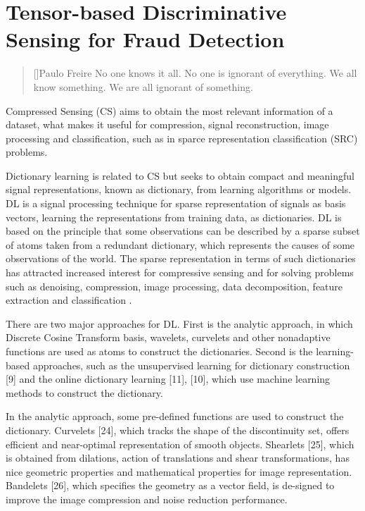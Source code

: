 \chapter{Tensor-based Discriminative Sensing for Fraud Detection}
\label{ch:4_tensor_dl}

\begin{quotation}[]{Paulo Freire}
No one knows it all. No one is ignorant of everything. We all know something. We are all ignorant of something.
\end{quotation}


Compressed Sensing (CS) aims to obtain the most relevant information of a dataset, what makes it useful for compression, signal reconstruction, image processing and classification, such as in sparce representation classification (SRC) problems. 

Dictionary learning is related to CS but seeks to obtain compact and meaningful signal representations, known as dictionary, from learning algorithms or models. DL is a signal processing technique for sparse representation of signals as basis vectors, learning the representations from training data, as dictionaries. DL is based on the principle that some observations can be described by a sparse subset of atoms taken from a redundant dictionary, which represents the causes of some observations of the world. The sparse representation in terms of such dictionaries has attracted increased interest for compressive sensing and for solving problems such as denoising, compression, image processing, data decomposition, feature extraction and classification \cite{tosic2011dictionary, zhang2010discriminative, zhu2016coupled,ravishankar2011mr}. 

There are two major approaches for DL. First is the analytic approach, in which Discrete Cosine Transform basis, wavelets, curvelets and other nonadaptive functions are used as atoms to construct the dictionaries. Second is the learning-based approaches, such as the unsupervised learning for dictionary construction [9] and the online dictionary learning [11], [10], which use machine learning methods to construct the dictionary. 

In the analytic approach, some pre-defined functions are used to construct the dictionary. Curvelets [24], which tracks the shape of the discontinuity set, offers efficient and near-optimal representation of smooth objects. Shearlets [25], which is obtained from dilations, action of translations and shear transformations, has nice geometric properties and mathematical properties for image representation. Bandelets [26], which specifies the geometry as a vector field, is de-signed to improve the image compression and noise reduction performance. 

